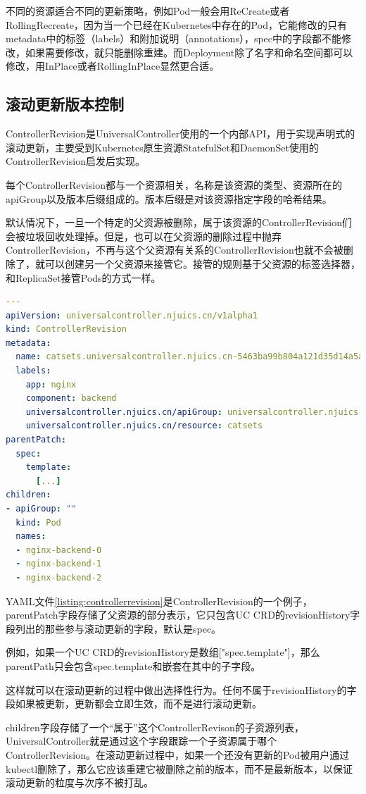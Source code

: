 \documentclass[macfonts,master]{njuthesis}
\begin{document}
不同的资源适合不同的更新策略，例如Pod一般会用ReCreate或者RollingRecreate，因为当一个已经在Kubernetes中存在的Pod，它能修改的只有metadata中的标签（labels）和附加说明（annotations），spec中的字段都不能修改，如果需要修改，就只能删除重建。而Deployment除了名字和命名空间都可以修改，用InPlace或者RollingInPlace显然更合适。

\subsection{滚动更新版本控制}
ControllerRevision是UniversalController使用的一个内部API，用于实现声明式的滚动更新，主要受到Kubernetes原生资源StatefulSet和DaemonSet使用的ControllerRevision启发后实现。

每个ControllerRevision都与一个资源相关，名称是该资源的类型、资源所在的apiGroup以及版本后缀组成的。版本后缀是对该资源指定字段的哈希结果。

默认情况下，一旦一个特定的父资源被删除，属于该资源的ControllerRevision们会被垃圾回收处理掉。但是，也可以在父资源的删除过程中抛弃ControllerRevision，不再与这个父资源有关系的ControllerRevision也就不会被删除了，就可以创建另一个父资源来接管它。接管的规则基于父资源的标签选择器，和ReplicaSet接管Pods的方式一样。

\begin{lstlisting}[language=yaml,caption=ControllerRevision示例,label=listing:controllerrevision]
---
apiVersion: universalcontroller.njuics.cn/v1alpha1
kind: ControllerRevision
metadata:
  name: catsets.universalcontroller.njuics.cn-5463ba99b804a121d35d14a5ab74546d1e8ba953
  labels:
    app: nginx
    component: backend
    universalcontroller.njuics.cn/apiGroup: universalcontroller.njuics.cn
    universalcontroller.njuics.cn/resource: catsets
parentPatch:
  spec:
    template:
      [...]
children:
- apiGroup: ""
  kind: Pod
  names:
  - nginx-backend-0
  - nginx-backend-1
  - nginx-backend-2
\end{lstlisting}

YAML文件\ref{listing:controllerrevision}是ControllerRevision的一个例子，parentPatch字段存储了父资源的部分表示，它只包含UC CRD的revisionHistory字段列出的那些参与滚动更新的字段，默认是spec。

例如，如果一个UC CRD的revisionHistory是数组["spec.template"]，那么parentPath只会包含spec.template和嵌套在其中的子字段。

这样就可以在滚动更新的过程中做出选择性行为。任何不属于revisionHistory的字段如果被更新，更新都会立即生效，而不是进行滚动更新。

children字段存储了一个“属于”这个ControllerRevison的子资源列表，UniversalController就是通过这个字段跟踪一个子资源属于哪个ControllerRevision。在滚动更新过程中，如果一个还没有更新的Pod被用户通过kubectl删除了，那么它应该重建它被删除之前的版本，而不是最新版本，以保证滚动更新的粒度与次序不被打乱。
\end{document}
